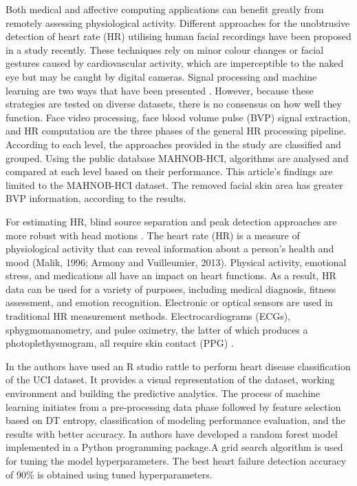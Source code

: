 \documentclass{article}
\begin{document}
Both medical and affective computing applications can benefit greatly from remotely assessing physiological activity. Different approaches for the unobtrusive detection of heart rate (HR) utilising human facial recordings have been proposed in a study recently. These techniques rely on minor colour changes or facial gestures caused by cardiovascular activity, which are imperceptible to the naked eye but may be caught by digital cameras. Signal processing and machine learning are two ways that have been presented \cite{rt4}. However, because these strategies are tested on diverse datasets, there is no consensus on how well they function. Face video processing, face blood volume pulse (BVP) signal extraction, and HR computation are the three phases of the general HR processing pipeline. According to each level, the approaches provided in the study are classified and grouped. Using the public database MAHNOB-HCI, algorithms are analysed and compared at each level based on their performance. This article's findings are limited to the MAHNOB-HCI dataset. The removed facial skin area has greater BVP information, according to the results. 

For estimating HR, blind source separation and peak detection approaches are more robust with head motions \cite{rt4}.
The heart rate (HR) is a measure of physiological activity that can reveal information about a person's health and mood (Malik, 1996; Armony and Vuilleumier, 2013). Physical activity, emotional stress, and medications all have an impact on heart functions. As a result, HR data can be used for a variety of purposes, including medical diagnosis, fitness assessment, and emotion recognition. Electronic or optical sensors are used in traditional HR measurement methods. Electrocardiograms (ECGs), sphygmomanometry, and pulse oximetry, the latter of which produces a photoplethysmogram, all require skin contact (PPG) \cite{rt5}.

In \cite{rt7} the authors have used an R studio rattle to perform heart disease classification of the UCI dataset. It provides a visual representation of the dataset, working environment and building the predictive analytics. The process of machine learning initiates from a pre-processing data phase followed by feature selection based on DT entropy, classification of modeling performance evaluation, and the results with better accuracy. In \cite{rt8} authors have developed a random forest model implemented in a Python programming package.A grid search algorithm is used for tuning the model hyperparameters. The best heart failure detection accuracy of 90\% is obtained using tuned hyperparameters.
\end{document}
